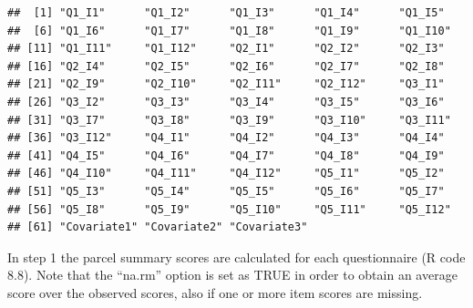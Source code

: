 \documentclass[]{book}
\begin{document}
\begin{verbatim}
##  [1] "Q1_I1"      "Q1_I2"      "Q1_I3"      "Q1_I4"      "Q1_I5"     
##  [6] "Q1_I6"      "Q1_I7"      "Q1_I8"      "Q1_I9"      "Q1_I10"    
## [11] "Q1_I11"     "Q1_I12"     "Q2_I1"      "Q2_I2"      "Q2_I3"     
## [16] "Q2_I4"      "Q2_I5"      "Q2_I6"      "Q2_I7"      "Q2_I8"     
## [21] "Q2_I9"      "Q2_I10"     "Q2_I11"     "Q2_I12"     "Q3_I1"     
## [26] "Q3_I2"      "Q3_I3"      "Q3_I4"      "Q3_I5"      "Q3_I6"     
## [31] "Q3_I7"      "Q3_I8"      "Q3_I9"      "Q3_I10"     "Q3_I11"    
## [36] "Q3_I12"     "Q4_I1"      "Q4_I2"      "Q4_I3"      "Q4_I4"     
## [41] "Q4_I5"      "Q4_I6"      "Q4_I7"      "Q4_I8"      "Q4_I9"     
## [46] "Q4_I10"     "Q4_I11"     "Q4_I12"     "Q5_I1"      "Q5_I2"     
## [51] "Q5_I3"      "Q5_I4"      "Q5_I5"      "Q5_I6"      "Q5_I7"     
## [56] "Q5_I8"      "Q5_I9"      "Q5_I10"     "Q5_I11"     "Q5_I12"    
## [61] "Covariate1" "Covariate2" "Covariate3"
\end{verbatim}

In step 1 the parcel summary scores are calculated for each
questionnaire (R code 8.8). Note that the ``na.rm'' option is set as
TRUE in order to obtain an average score over the observed scores, also
if one or more item scores are missing.
\end{document}

